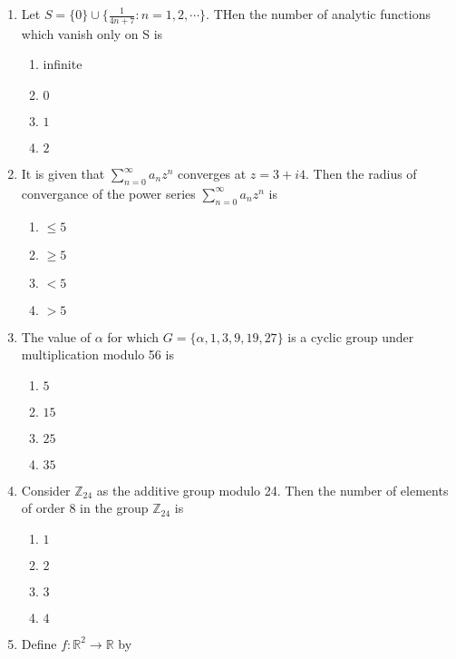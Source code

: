 \documentclass[journal,12pt,twocolumn]{IEEEtran}
\theoremstyle{remark}
\begin{document}
\begin{enumerate}
\item Let $S=\{0\}\cup \{\frac{1}{4n+7}:n=1,2,\cdots\}$. THen the number of analytic functions which vanish only on S is
\begin{multicols}{2}
\begin{enumerate}
    \item infinite
    \item $0$
    \item $1$
    \item $2$
\end{enumerate}    
\end{multicols}
\item It is given that $\sum_{n=0}^{\infty}a_n z^n$ converges at $z=3+i4$. Then the radius of convergance of the power series $\sum_{n=0}^{\infty}a_n z^n$ is 
\begin{multicols}{2}
\begin{enumerate}
    \item $\leq 5$
    \item $\geq 5$
    \item $<5$
    \item $>5$
\end{enumerate}    
\end{multicols}
\item The value of $\alpha$ for which $G=\{\alpha,1,3,9,19,27\}$ is a cyclic group under multiplication modulo 56 is 
\begin{multicols}{2}
\begin{enumerate}
    \item $5$
    \item $15$
    \item $25$
    \item $35$
\end{enumerate}    
\end{multicols}
\item Consider $\mathbb{Z}_{24}$ as the additive group modulo 24. Then the number of elements of order 8 in the group $\mathbb{Z}_{24}$ is
\begin{multicols}{2}
\begin{enumerate}
   \item $1$
    \item $2$
    \item $3$
    \item $4$
\end{enumerate}    
\end{multicols}
\item Define $f:\mathbb{R}^2\rightarrow \mathbb{R}$ by

\end{enumerate}
\end{document}
